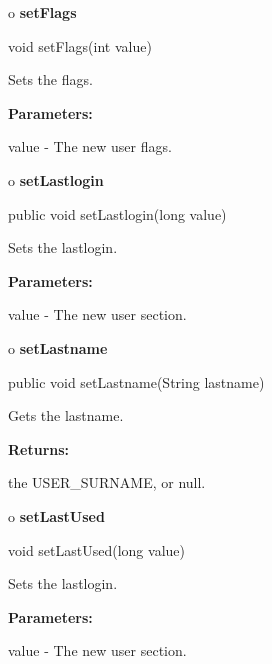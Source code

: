 o {\bf setFlags} 

\begin{PRE}
 void setFlags(int value)
\end{PRE}

\begin{description}
\htmlDD Sets the flags. 

\begin{description}
\item {\bf Parameters:}  

value - The new user flags.  
\end{description}

\end{description}

o {\bf setLastlogin} 

\begin{PRE}
 public void setLastlogin(long value)
\end{PRE}

\begin{description}
\htmlDD Sets the lastlogin. 

\begin{description}
\item {\bf Parameters:}  

value - The new user section.  
\end{description}

\end{description}

o {\bf setLastname} 

\begin{PRE}
 public void setLastname(String lastname)
\end{PRE}

\begin{description}
\htmlDD Gets the lastname. 

\begin{description}
\item {\bf Returns:}  

the USER\_SURNAME, or null.  
\end{description}

\end{description}

o {\bf setLastUsed} 

\begin{PRE}
 void setLastUsed(long value)
\end{PRE}

\begin{description}
\htmlDD Sets the lastlogin. 

\begin{description}
\item {\bf Parameters:}  

value - The new user section.  
\end{description}

\end{description}

